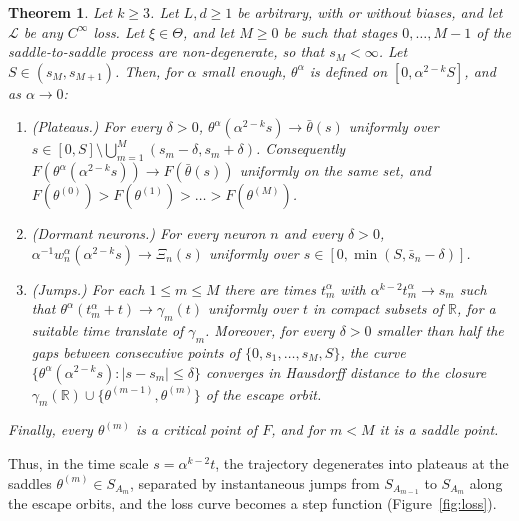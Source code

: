 \documentclass[11pt]{article}
\newtheorem{maintheorem}{Theorem}
\theoremstyle{definition}
\theoremstyle{remark}
\numberwithin{equation}{section}
\newcommand{\R}{\mathbb{R}}
\newcommand{\cL}{\mathcal{L}}
\newcommand{\sm}{\setminus}
\begin{document}
\begin{maintheorem}\label{thm:main}
Let $k\ge3$. Let $L,d\ge1$ be arbitrary, with or without biases, and let $\cL$ be any $C^\infty$ loss. Let $\xi\in\Theta$, and let $M\ge0$ be such that stages $0,\dots,M-1$ of the saddle-to-saddle process are non-degenerate, so that $s_M<\infty$. Let $S\in(s_M,s_{M+1})$. Then, for $\alpha$ small enough, $\theta^\alpha$ is defined on $[0,\alpha^{2-k}S]$, and as $\alpha\to0$:
\begin{enumerate}[label=\textup{(\roman*)}]
\item\emph{(Plateaus.)} For every $\delta>0$, $\theta^\alpha(\alpha^{2-k}s)\to\bar\theta(s)$ uniformly over $s\in[0,S]\sm\bigcup_{m=1}^M(s_m-\delta,s_m+\delta)$. Consequently $F(\theta^\alpha(\alpha^{2-k}s))\to F(\bar\theta(s))$ uniformly on the same set, and $F(\theta^{(0)})>F(\theta^{(1)})>\dots>F(\theta^{(M)})$.
\item\emph{(Dormant neurons.)} For every neuron $n$ and every $\delta>0$, $\alpha^{-1}w_n^\alpha(\alpha^{2-k}s)\to\Xi_n(s)$ uniformly over $s\in[0,\min(S,\bar s_n-\delta)]$.
\item\emph{(Jumps.)} For each $1\le m\le M$ there are times $t^\alpha_m$ with $\alpha^{k-2}t^\alpha_m\to s_m$ such that $\theta^\alpha(t^\alpha_m+t)\to\gamma_m(t)$ uniformly over $t$ in compact subsets of $\R$, for a suitable time translate of $\gamma_m$. Moreover, for every $\delta>0$ smaller than half the gaps between consecutive points of $\{0,s_1,\dots,s_M,S\}$, the curve $\{\theta^\alpha(\alpha^{2-k}s):|s-s_m|\le\delta\}$ converges in Hausdorff distance to the closure $\gamma_m(\R)\cup\{\theta^{(m-1)},\theta^{(m)}\}$ of the escape orbit.
\end{enumerate}
Finally, every $\theta^{(m)}$ is a critical point of $F$, and for $m<M$ it is a saddle point.
\end{maintheorem}

Thus, in the time scale $s=\alpha^{k-2}t$, the trajectory degenerates into plateaus at the saddles $\theta^{(m)}\in S_{A_m}$, separated by instantaneous jumps from $S_{A_{m-1}}$ to $S_{A_m}$ along the escape orbits, and the loss curve becomes a step function (Figure~\ref{fig:loss}).
\end{document}
